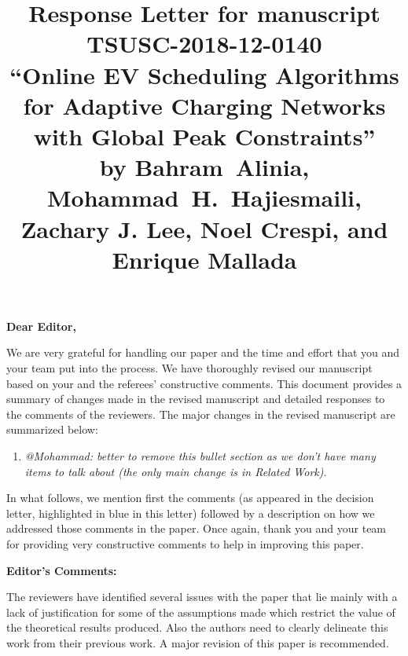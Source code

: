 \documentclass[11pt]{article}
\begin{document}
\title{Response Letter for manuscript TSUSC-2018-12-0140 \\ ``Online EV Scheduling Algorithms for Adaptive Charging Networks with Global Peak Constraints'' \\
	\vspace{4mm} \large
	by  Bahram~Alinia, Mohammad~H.~Hajiesmaili, Zachary J. Lee, Noel Crespi, and Enrique Mallada
}

\maketitle

\textbf{Dear Editor,}

We are very grateful for handling our paper and the time and effort that you and your team put into the process. We have thoroughly revised our manuscript based on your and the referees' constructive comments. This document provides a summary of changes made in the revised manuscript and detailed responses to the comments of the reviewers. The major changes in the revised manuscript are summarized below:

\begin{enumerate}
\item \textit{\color{red} @Mohammad: better to remove this bullet section as we don't have many items to talk about (the only main change is in Related Work)}. 


\end{enumerate}


In what follows, we mention first the comments (as appeared in the decision letter, highlighted in {\color{blue} blue} in this letter) followed by a description on how we addressed those comments in the paper. Once again, thank you and your team for providing very constructive comments to help in improving this paper.



\newpage

{\Large\textbf{Editor's Comments:}}
\vspace{3mm}

{\color{blue}The reviewers have identified several issues with the paper that lie mainly with a lack of justification for some of the assumptions made which restrict the value of the theoretical results produced. Also the authors need to clearly delineate this work from their previous work. A major revision of this paper is recommended.}
\end{document}
